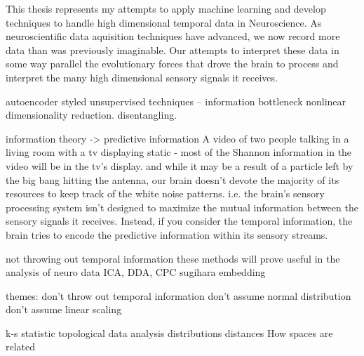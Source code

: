 This thesis represents my attempts to apply machine learning and develop techniques to handle high dimensional temporal data in Neuroscience. As neuroscientific data aquisition techniques have advanced, we now record more data than was previously imaginable. Our attempts to interpret these data in some way parallel the evolutionary forces that drove the brain to process and interpret the many high dimensional sensory signals it receives. 

autoencoder styled unsupervised techniques -- information bottleneck
nonlinear dimensionality reduction. disentangling.

information theory -> predictive information
A video of two people talking in a living room with a tv displaying static - most of the Shannon information in the video will be in the tv's display. and while it may be a result of a particle left by the big bang hitting the antenna, our brain doesn't devote the majority of its resources to keep track of the white noise patterns. i.e. the brain's sensory processing system isn't designed to maximize the mutual information between the sensory signals it receives. Instead, if you consider the temporal information, the brain tries to encode the predictive information within its sensory streams. 

not throwing out temporal information
these methods will prove useful in the analysis of neuro data
ICA, DDA, CPC
sugihara embedding

themes:
don't throw out temporal information
don't assume normal distribution
don't assume linear scaling

k-s statistic
topological data analysis
distributions
distances
How spaces are related